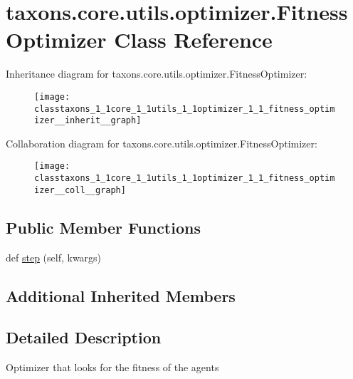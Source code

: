 \hypertarget{classtaxons_1_1core_1_1utils_1_1optimizer_1_1_fitness_optimizer}{}\section{taxons.\+core.\+utils.\+optimizer.\+Fitness\+Optimizer Class Reference}
\label{classtaxons_1_1core_1_1utils_1_1optimizer_1_1_fitness_optimizer}


Inheritance diagram for taxons.\+core.\+utils.\+optimizer.\+Fitness\+Optimizer\+:
\nopagebreak
\begin{figure}[H]
\begin{center}
\leavevmode
\texttt{[image: classtaxons\_1\_1core\_1\_1utils\_1\_1optimizer\_1\_1\_fitness\_optimizer\_\_inherit\_\_graph]}
\end{center}
\end{figure}


Collaboration diagram for taxons.\+core.\+utils.\+optimizer.\+Fitness\+Optimizer\+:
\nopagebreak
\begin{figure}[H]
\begin{center}
\leavevmode
\texttt{[image: classtaxons\_1\_1core\_1\_1utils\_1\_1optimizer\_1\_1\_fitness\_optimizer\_\_coll\_\_graph]}
\end{center}
\end{figure}
\subsection*{Public Member Functions}
\begin{DoxyCompactItemize}
\item 
def \hyperlink{classtaxons_1_1core_1_1utils_1_1optimizer_1_1_fitness_optimizer_aeccb192e41aeb3e534a1cfc623442802}{step} (self, kwargs)
\end{DoxyCompactItemize}
\subsection*{Additional Inherited Members}


\subsection{Detailed Description}
\begin{DoxyVerb}Optimizer that looks for the fitness of the agents
\end{DoxyVerb}
 

